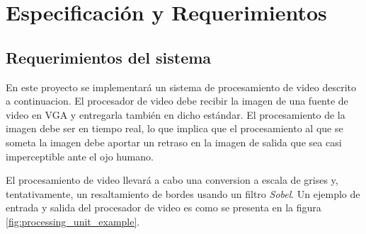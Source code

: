 \documentclass[10pt, letterpaper, conference]{IEEEtran}
\begin{document}
\section{Especificaci\'on y Requerimientos}
\label{sec:req}

\subsection{Requerimientos del sistema}

En este proyecto se implementar\'a un sistema de procesamiento de
video descrito a continuacion.  El procesador de video debe recibir la
imagen de una fuente de video en VGA y entregarla tambi\'en en dicho
est\'andar. El procesamiento de la imagen debe ser en tiempo real, lo que
implica que el procesamiento al que se someta la imagen debe aportar
un retraso en la imagen de salida que sea casi imperceptible ante el
ojo humano.

El procesamiento de video llevar\'a a cabo una conversion a escala de
grises y, tentativamente, un resaltamiento de bordes usando un filtro
\emph{Sobel}. Un ejemplo de entrada y salida del procesador de video
es como se presenta en la figura \ref{fig:processing_unit_example}.
\end{document}
